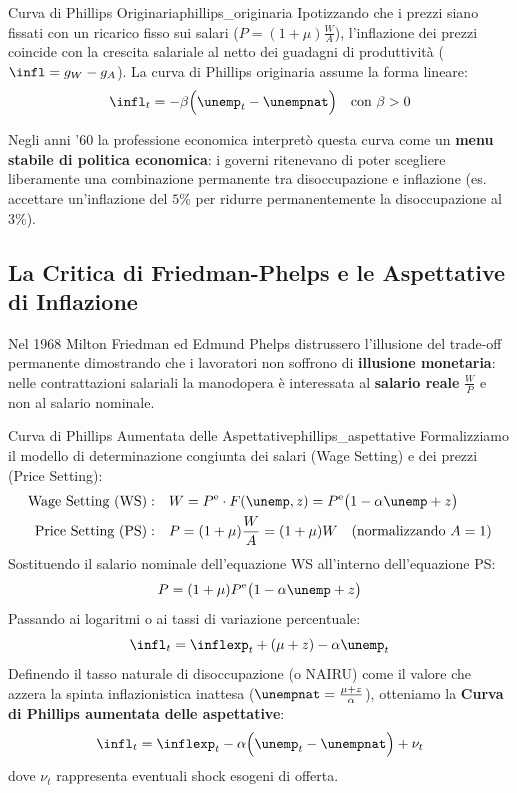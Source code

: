 \begin{modello}{Curva di Phillips Originaria}{phillips_originaria}
Ipotizzando che i prezzi siano fissati con un ricarico fisso sui salari ($P = (1+\mu)\frac{W}{A}$), l'inflazione dei prezzi coincide con la crescita salariale al netto dei guadagni di produttività ($\infl = g_W - g_A$). La curva di Phillips originaria assume la forma lineare:
\begin{equation}
    \infl_t = -\beta \Big( \unemp_t - \unempnat \Big) \quad \text{con } \beta > 0 \label{eq:phillips_orig}
\end{equation}
\end{modello}

Negli anni '60 la professione economica interpretò questa curva come un \textbf{menu stabile di politica economica}: i governi ritenevano di poter scegliere liberamente una combinazione permanente tra disoccupazione e inflazione (es. accettare un'inflazione del $5$\% per ridurre permanentemente la disoccupazione al $3$\%).

\subsection{La Critica di Friedman-Phelps e le Aspettative di Inflazione}
Nel 1968 Milton Friedman ed Edmund Phelps distrussero l'illusione del trade-off permanente dimostrando che i lavoratori non soffrono di \textbf{illusione monetaria}: nelle contrattazioni salariali la manodopera è interessata al \textbf{salario reale} $\frac{W}{P}$ e non al salario nominale.

\begin{modello}{Curva di Phillips Aumentata delle Aspettative}{phillips_aspettative}
Formalizziamo il modello di determinazione congiunta dei salari (Wage Setting) e dei prezzi (Price Setting):
\begin{align}
    \text{Wage Setting (WS)}: &\quad W = P^{\mathrm{e}} \cdot F(\unemp, z) = P^{\mathrm{e}} \big( 1 - \alpha \unemp + z \big) \\
    \text{Price Setting (PS)}: &\quad P = (1 + \mu) \frac{W}{A} = (1 + \mu) W \quad (\text{normalizzando } A=1)
\end{align}
Sostituendo il salario nominale dell'equazione WS all'interno dell'equazione PS:
\begin{equation}
    P = (1 + \mu) P^{\mathrm{e}} \big( 1 - \alpha \unemp + z \big)
\end{equation}
Passando ai logaritmi o ai tassi di variazione percentuale:
\begin{equation}
    \infl_t = \inflexp_t + (\mu + z) - \alpha \unemp_t
\end{equation}
Definendo il tasso naturale di disoccupazione (o NAIRU) come il valore che azzera la spinta inflazionistica inattesa ($\unempnat = \frac{\mu + z}{\alpha}$), otteniamo la \textbf{Curva di Phillips aumentata delle aspettative}:
\begin{equation}
    \infl_t = \inflexp_t - \alpha \Big( \unemp_t - \unempnat \Big) + \nu_t \label{eq:phillips_friedman}
\end{equation}
dove $\nu_t$ rappresenta eventuali shock esogeni di offerta.
\end{modello}


